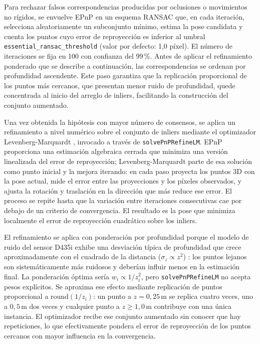 Para rechazar falsos correspondencias producidas por oclusiones o movimientos
no rígidos, se envuelve EPnP en un esquema RANSAC que, en cada iteración,
selecciona aleatoriamente un subconjunto mínimo, estima la pose candidata y
cuenta los puntos cuyo error de reproyección es inferior al umbral
\texttt{essential\_ransac\_threshold} (valor por defecto: 1{,}0 píxel). El
número de iteraciones se fija en 100 con confianza del $99\,$\%. Antes de
aplicar el refinamiento ponderado que se describe a continuación, las
correspondencias se ordenan por profundidad ascendente. Este paso garantiza
que la replicación proporcional de los puntos más cercanos, que presentan
menor ruido de profundidad, quede concentrada al
inicio del arreglo de inliers, facilitando la construcción del conjunto
aumentado.

Una vez obtenida la hipótesis con mayor número de consensos, se aplica un
refinamiento a nivel numérico sobre el conjunto de inliers mediante el
optimizador Levenberg-Marquardt \cite{Marquardt1963LM}, invocado a través
de \texttt{solvePnPRefineLM}. EPnP proporciona una estimación algebraica
cerrada que minimiza una versión linealizada del error de reproyección;
Levenberg-Marquardt parte de esa solución como punto inicial y la mejora
iterando: en cada paso proyecta los puntos 3D con la pose actual, mide el
error entre las proyecciones y los píxeles observados, y ajusta la rotación
y traslación en la dirección que más reduce ese error. El proceso se repite
hasta que la variación entre iteraciones consecutivas cae por debajo de un
criterio de convergencia. El resultado es la pose que minimiza localmente el
error de reproyección cuadrático sobre los inliers.

El refinamiento se aplica con ponderación por profundidad porque el modelo
de ruido del sensor D435i exhibe una desviación típica de profundidad que
crece aproximadamente con el cuadrado de la distancia ($\sigma_z \propto z^2$)
\cite{RS-D400}: los puntos lejanos son sistemáticamente más ruidosos y
deberían influir menos en la estimación final. La ponderación óptima sería
$w_i \propto 1/z_i^2$, pero \texttt{solvePnPRefineLM} no acepta pesos
explícitos. Se aproxima ese efecto mediante replicación de puntos proporcional
a $\text{round}(1/z_i)$: un punto a $z = 0{,}25\,\text{m}$ se replica cuatro
veces, uno a $0{,}5\,\text{m}$ dos veces y cualquier punto a
$z \geq 1{,}0\,\text{m}$ contribuye con una única instancia. El optimizador
recibe ese conjunto aumentado sin conocer que hay repeticiones, lo que
efectivamente pondera el error de reproyección de los puntos cercanos con
mayor influencia en la convergencia.

